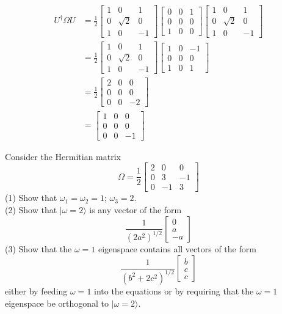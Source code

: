 \documentclass[../principles-of-quantum-mechanics.tex]{subfiles}
\begin{document}
\begin{questions}
\begin{solution}
\begin{align*}
		U^\dagger\Omega{U} &= \frac{1}{2}\begin{bmatrix}1 & 0 & 1 \\ 0 & \sqrt{2} & 0 \\ 1 & 0 & {-1}\end{bmatrix}\begin{bmatrix}0 & 0 & 1 \\ 0 & 0 & 0 \\ 1 & 0 & 0 \end{bmatrix}\begin{bmatrix}1 & 0 & 1 \\ 0 & \sqrt{2} & 0 \\ 1 & 0 & {-1}\end{bmatrix} \\
		&= \frac{1}{2}\begin{bmatrix}1 & 0 & 1 \\ 0 & \sqrt{2} & 0 \\ 1 & 0 & {-1}\end{bmatrix}\begin{bmatrix}1 & 0 & -1\\ 0 & 0 & 0 \\ 1 & 0 & 1\end{bmatrix} \\
		&= \frac{1}{2}\begin{bmatrix}2 & 0 & 0\\ 0 & 0 & 0\\ 0 & 0 & -2\end{bmatrix} \\
		&= \begin{bmatrix}1 & 0 & 0 \\ 0 & 0 & 0 \\ 0 & 0 & -1\end{bmatrix}
	\end{align*}
\end{solution}

\question Consider the Hermitian matrix
\[
	\Omega = \frac{1}{2}\begin{bmatrix}2 & 0 & 0 \\ 0 & 3 & {-1} \\ 0 & {-1} & {3} \end{bmatrix}
\]
(1) Show that $\omega_1=\omega_2=1$; $\omega_3=2$. \\
(2) Show that $|\omega=2\rangle$ is any vector of the form
\[
	\frac{1}{(2a^2)^{1/2}}\begin{bmatrix}0 \\ a \\ -a\end{bmatrix}
\]
(3) Show that the $\omega=1$ eigenspace contains all vectors of the form
\[
	\frac{1}{(b^2+2c^2)^{1/2}}\begin{bmatrix}b \\ c \\ c\end{bmatrix}
\]
either by feeding $\omega=1$ into the equations or by requiring that the $\omega=1$ eigenspace be orthogonal to $|\omega=2\rangle$.


\end{questions}
\end{document}
